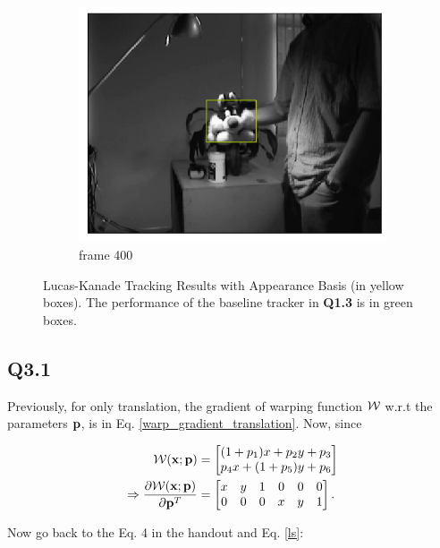 \documentclass[11pt]{article}
\begin{document}
\begin{figure}[h!]
\begin{subfigure}{.195\textwidth}
      \includegraphics[width=.95\linewidth]{../results/sylvseqrects_399.png}
      \caption{frame 400}
    \end{subfigure}\hfill
    \caption{Lucas-Kanade Tracking Results with Appearance Basis (in yellow boxes). The performance of the baseline tracker in \textbf{Q1.3} is in green boxes. }
    \label{fig:q2.3}
\end{figure}

\newpage
\subsection*{Q3.1} \label{LK_affine}

Previously, for only translation, the gradient of warping function $\mathcal{W}$ w.r.t the parameters $\mathbf{p}$, is in Eq. \ref{warp_gradient_translation}. Now, since

\begin{align}
    \mathcal{W}(\mathbf{x}; \mathbf{p}) &=
    \begin{bmatrix}
        (1+p_1)x+p_2 y+p_3 \\
        p_4 x+(1+p_5) y +p_6
    \end{bmatrix}
    \\ \Rightarrow
    \frac{\partial \mathcal{W}(\mathbf{x}; \mathbf{p})} {\partial \mathbf{p}^T} &=
    \begin{bmatrix}
        x&y&1&0&0&0 \\
        0&0&0&x&y&1
    \end{bmatrix}.
\end{align}

Now go back to the Eq. 4 in the handout and Eq. \ref{ls}:
\newcommand {\Wxdp} {\W(\x;\p+\Delta \p)}
\newcommand {\Wxp} {\W(\x;\p)}
\end{document}

